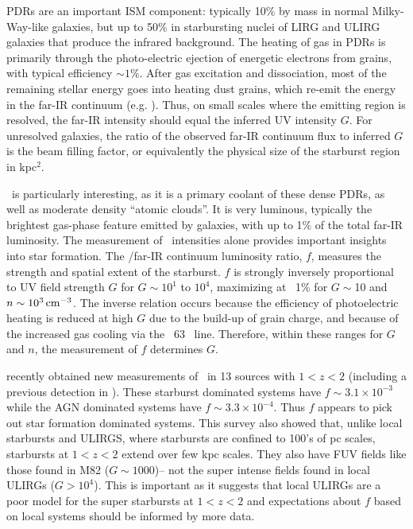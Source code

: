 PDRs are an important ISM component: typically 10\% by mass in normal
Milky-Way-like galaxies, but up to 50\% in starbursting nuclei of LIRG
and ULIRG galaxies that produce the infrared background.  The heating
of gas in PDRs is primarily through the photo-electric ejection of
energetic electrons from grains, with typical efficiency $\sim 1\%$.
After gas excitation and dissociation, most of the remaining stellar
energy goes into heating dust grains, which re-emit the energy in the
far-IR continuum (e.g. \cite{tielens85}).  Thus, on small scales where
the emitting region is resolved, the far-IR intensity should equal the
inferred UV intensity $G$.  For unresolved galaxies, the ratio of the
observed far-IR continuum flux to inferred $G$ is the beam filling
factor, or equivalently the physical size of the starburst region in
kpc$^2$.

\cii\ is particularly interesting, as it is a primary coolant of these
dense PDRs, as well as moderate density ``atomic clouds''.  It is very
luminous, typically the brightest gas-phase feature emitted by
galaxies, with up to 1\% of the total far-IR luminosity.  The
measurement of \cii\ intensities alone provides important insights
into star formation.  The \cii/far-IR continuum luminosity ratio, $f$,
measures the strength and spatial extent of the starburst.  $f$ is
strongly inversely proportional to UV field strength $G$ for
$G\sim10^1$ to $10^4$, maximizing at ~1\% for $G\sim$10 and $n\sim
10^3\rm\,cm^{-3}$.  The inverse relation occurs because the efficiency
of photoelectric heating is reduced at high $G$ due to the build-up of
grain charge, and because of the increased gas cooling via the \oi\ 63
\mum\ line. Therefore, within these ranges for $G$ and $n$, the
measurement of $f$ determines $G$.

 recently obtained new measurements of \cii\ in 13
sources with $1 < z < 2$ (including a previous detection in
).  These starburst dominated systems have
$f\sim3.1\times10^{-3}$ while the AGN dominated systems have
$f\sim3.3\times10^{-4}$.  Thus $f$ appears to pick out star formation
dominated systems.  This survey also showed that, unlike local
starbursts and ULIRGS, where starbursts are confined to 100's of pc
scales, starbursts at $1 < z < 2$ extend over few kpc scales.  They
also have FUV fields like those found in M82 ($G\sim1000$)-- not the
super intense fields found in local ULIRGs ($G>10^4$).  This is
important as it suggests that local ULIRGs are a poor model for the
super starbursts at $1 < z < 2$ and expectations about $f$ based on
local systems \citep[e.g.][]{curran09,luhman03} should be informed by
more data.

